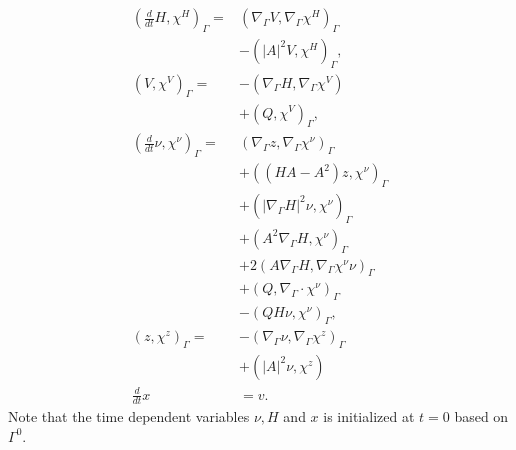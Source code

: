 \begin{subequations}
\label{eq:WE_weak_form}
\begin{align}
\left( \frac{d}{dt}H, \chi ^{H} \right)_{\Gamma } =&  \left( \nabla _{\Gamma } V, \nabla _{\Gamma }\chi ^{H} \right) _{\Gamma } \nonumber \\
                                                   &- \left( \left\lvert A \right\rvert ^2 V, \chi ^{H} \right) _{\Gamma },   \\
\left( V, \chi ^{V} \right)_{\Gamma } =& -\left( \nabla _{\Gamma } H, \nabla _{\Gamma } \chi ^{V} \right) \nonumber \\
 & + \left( Q, \chi ^{V} \right)_{\Gamma },   \\
\left( \frac{d}{dt} \nu , \chi ^{\nu } \right)_{\Gamma } =& \left( \nabla _{\Gamma }z, \nabla _{\Gamma } \chi ^{\nu } \right) _{\Gamma }\nonumber   \\
 & + \left( ( HA - A^2  )z,\chi^\nu  \right)_{\Gamma }   \nonumber \\
 & + \left( \left\lvert \nabla _{\Gamma } H \right\rvert^2 \nu , \chi ^{\nu }  \right)_{\Gamma} \nonumber  \\
 & + \left(  A^2\nabla _{\Gamma } H, \chi ^{\nu }  \right)_{\Gamma} \nonumber  \\
 & + 2 \left( A \nabla _{\Gamma } H, \nabla _{\Gamma } \chi ^{\nu } \nu  \right)_{\Gamma} \nonumber    \\
 &  + \left( Q, \nabla _{\Gamma } \cdot \chi ^{\nu }  \right)_{\Gamma } \nonumber  \\
  &- \left( QH\nu , \chi ^{\nu } \right) _{\Gamma},\\
\left( z, \chi ^{z} \right) _{\Gamma }  =& - \left( \nabla _{\Gamma } \nu , \nabla _{\Gamma } \chi ^{z} \right)_{\Gamma} \nonumber \\
 & + \left( \left\lvert A \right\rvert ^2 \nu , \chi ^{z} \right) \\
\frac{d}{dt}x &= v
.\end{align}
\end{subequations}
Note that the time dependent variables $\nu, H $ and $x$ is initialized at $t=0$  based on $\Gamma ^{0}$.














